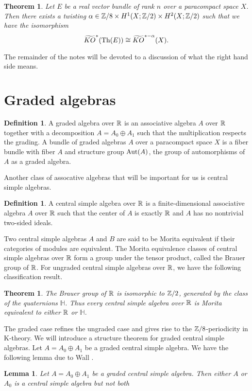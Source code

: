 \documentclass{amsart}
\numberwithin{equation}{section}
\theoremstyle{plain} %
\newtheorem{theorem}[equation]{Theorem}
\newtheorem{lemma}[equation]{Lemma}
\theoremstyle{definition}
\newtheorem{definition}[equation]{Definition}
\theoremstyle{remark}
\begin{document}
\begin{theorem}
    Let $E$ be a real vector bundle of rank $n$ over a paracompact space $X$. Then there exists a twisting $\alpha \in \mathbb{Z}/8 \times H^1(X; \mathbb{Z}/2) \times H^2(X; \mathbb{Z}/2)$ such that we have the isomorphism \begin{align*}
    \widetilde{KO}^*(\operatorname{Th}(E)) \cong \widetilde{KO}^{*-\alpha}(X).
\end{align*}
\end{theorem}

The remainder of the notes will be devoted to a discussion of what the right hand side means.

\section{Graded algebras}
\begin{definition}
    A graded algebra over $\mathbb{R}$ is an associative algebra $A$ over $\mathbb{R}$ together with a decomposition $A = A_0 \oplus A_1$ such that the multiplication respects the grading. A bundle of graded algebras $A$ over a paracompact space $X$ is a fiber bundle with fiber $A$ and structure group $\operatorname{Aut}(A)$, the group of automorphisms of $A$ as a graded algebra.
\end{definition}


Another class of assocative algebras that will be important for us is central simple algebras.
\begin{definition}
    A central simple algebra over $\mathbb{R}$ is a finite-dimensional associative algebra $A$ over $\mathbb{R}$ such that the center of $A$ is exactly $\mathbb{R}$ and $A$ has no nontrivial two-sided ideals.
\end{definition}
Two central simple algebras $A$ and $B$ are said to be Morita equivalent if their categories of modules are equivalent. The Morita equivalence classes of central simple algebras over $\mathbb{R}$ form a group under the tensor product, called the Brauer group of $\mathbb{R}$. For ungraded central simple algebras over $\mathbb{R}$, we have the following classification result.
\begin{theorem}
    The Brauer group of $\mathbb{R}$ is isomorphic to $\mathbb{Z}/2$, generated by the class of the quaternions $\mathbb{H}$. Thus every central simple algebra over $\mathbb{R}$ is Morita equivalent to either $\mathbb{R}$ or $\mathbb{H}$.
\end{theorem}
The graded case refines the ungraded case and gives rise to the $\mathbb{Z}/8$-periodicity in K-theory. We will introduce a structure theorem for graded central simple algebras.
Let $A = A_0 \oplus A_1$ be a graded central simple algebra. We have the following lemma due to Wall \cite{Wall}.
\begin{lemma}
    Let $A = A_0 \oplus A_1$ be a graded central simple algebra. Then either $A$ or $A_0$ is a central simple algebra but not both
\end{lemma}
\end{document}

